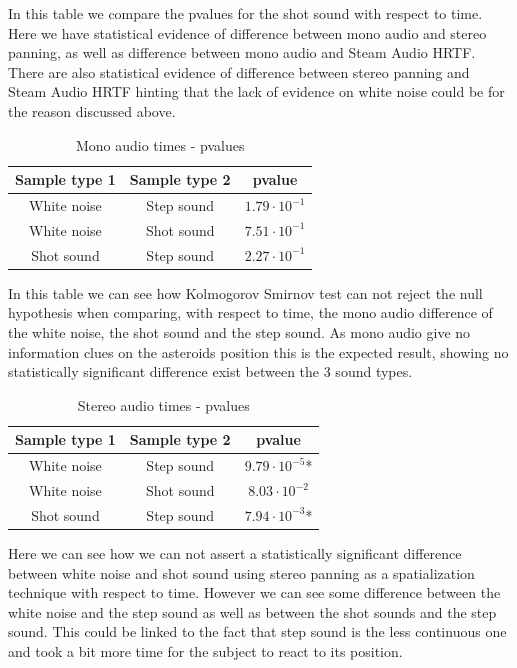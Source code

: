 \documentclass[conference]{IEEEtran}
\begin{document}
In this table we compare the pvalues for the shot sound with respect to time. Here we have statistical evidence of difference between mono audio and stereo panning, as well as difference between mono audio and Steam Audio HRTF. There are also statistical evidence of difference between stereo panning and Steam Audio HRTF hinting that the lack of evidence on white noise could be for the reason discussed above.

\begin{table}[htbp]
\caption{Mono audio times - pvalues}
\begin{center}
\begin{tabular}{|c|c|c|}
\hline
\textbf{Sample type 1} & \textbf{Sample type 2} & \textbf{pvalue}\\
\hline
White noise & Step sound & $1.79 \cdot 10^{-1}$\\
\hline
White noise & Shot sound & $7.51 \cdot 10^{-1}$\\
\hline
Shot sound & Step sound & $2.27 \cdot 10^{-1}$\\
\hline
\end{tabular}
\label{tab4}
\end{center}
\end{table}

In this table we can see how Kolmogorov Smirnov test can not reject the null hypothesis when comparing, with respect to time, the mono audio difference of the white noise, the shot sound and the step sound. As mono audio give no information clues on the asteroids position this is the expected result, showing no statistically significant difference exist between the 3 sound types.

\begin{table}[htbp]
\caption{Stereo audio times - pvalues}
\begin{center}
\begin{tabular}{|c|c|c|}
\hline
\textbf{Sample type 1} & \textbf{Sample type 2} & \textbf{pvalue}\\
\hline
White noise & Step sound & $9.79 \cdot 10^{-5}$*\\
\hline
White noise & Shot sound & $8.03 \cdot 10^{-2}$\\
\hline
Shot sound & Step sound & $7.94 \cdot 10^{-3}$*\\
\hline
\end{tabular}
\label{tab6}
\end{center}
\end{table}

Here we can see how we can not assert a statistically significant difference between white noise and shot sound using stereo panning as a spatialization technique with respect to time. However we can see some difference between the white noise and the step sound as well as between the shot sounds and the step sound. This could be linked to the fact that step sound is the less continuous one and took a bit more time for the subject to react to its position.
\end{document}
